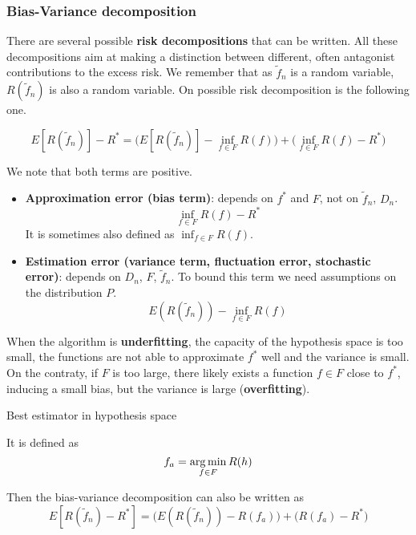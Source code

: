 \documentclass[
10pt, %
a4paper, %
oneside, %
headinclude,footinclude, %
BCOR5mm, %
]{scrartcl}
\begin{document}
\subsubsection{\large\color{Periwinkle}Bias-Variance decomposition}

There are several possible \textbf{{risk decompositions}} that can be written. All these decompositions aim at making a distinction between different, often antagonist contributions to the excess risk. We remember that as $ \tilde{f}_n$ is a random variable, $ R(\tilde{f}_n)$ is also a random variable. On possible risk decomposition is the following one.

\begin{equation*}
    E[R( \tilde{f}_n)]-R^* = \Big(E[R( \tilde{f}_n)]- \inf_{f\in F}R(f)\Big) +\Big(\inf_{f\in F}R(f)-R^* \Big)
\end{equation*}

We note that both terms are positive.

\begin{itemize}
    \item \textbf{{Approximation error (bias term)}}: depends on $f^*$ and $F$, not on $ \tilde{f}_n$, $D_n$.
	\begin{equation*}
	    \inf_{f\in F}R(f)-R^*
	\end{equation*}
	It is sometimes also defined as $\inf_{f\in F}R(f)$.
    \item \textbf{{Estimation error (variance term, fluctuation error, stochastic error)}}: depends on $D_n$, $F$, $ \tilde{f}_n$. To bound this term we need assumptions on the distribution $P$.
	\begin{equation*}
	    E(R( \tilde{f}_n))- \inf_{f\in F}R(f)
	\end{equation*}
\end{itemize}


When the algorithm is \textbf{{underfitting}}, the capacity of the hypothesis space is too small, the functions are not able to approximate $f^*$ well and the variance is small. On the contraty, if $F$ is too large, there likely exists a function $f\in F$ close to $f^*$, inducing a small bias, but the variance is large (\textbf{{overfitting}}).

\begin{remark}

\begin{definition}{Best estimator in hypothesis space}

    It is defined as
    \begin{equation*}
	f_a = \operatorname*{arg\,min}_{f\in F}R(h)
    \end{equation*}
\end{definition}

    Then the bias-variance decomposition can also be written as
\begin{equation*}
    E[R( \tilde{f}_n)-R^*] = \Big(E(R( \tilde{f}_n))- R(f_a)\Big) +\Big(R(f_a)-R^* \Big)
\end{equation*}
\end{remark}
\end{document}
